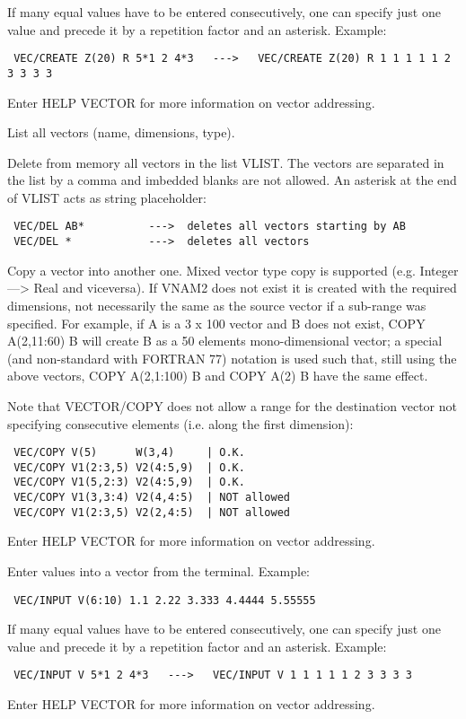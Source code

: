 If many equal values have to be entered consecutively, one can specify just
one value and precede it by a repetition factor and an asterisk. Example:
\begin{verbatim}
 VEC/CREATE Z(20) R 5*1 2 4*3   --->   VEC/CREATE Z(20) R 1 1 1 1 1 2 3 3 3 3
\end{verbatim}
Enter HELP VECTOR for more information on vector addressing.
\ENDTEXT

\BEGTEXT
List all vectors (name, dimensions, type).
\ENDTEXT

\BEGARG
{}
\ENDARG
\BEGTEXT
Delete from memory all vectors in the list VLIST.
The vectors are separated in the list by a comma and imbedded blanks
are not allowed. An asterisk at the end of VLIST acts as string placeholder:
\begin{verbatim}
 VEC/DEL AB*          --->  deletes all vectors starting by AB
 VEC/DEL *            --->  deletes all vectors
\end{verbatim}
\ENDTEXT

\BEGARG
{}
\ENDARG
\BEGTEXT
Copy a vector into another one.
Mixed vector type copy is supported (e.g. Integer ---> Real and viceversa).
If VNAM2 does not exist it is created with the required dimensions,
not necessarily the same as the source vector if a sub-range was specified.
For example, if A is a 3 x 100 vector and B does not exist,
COPY A(2,11:60) B will create B as a 50 elements mono-dimensional vector;
a special (and non-standard with FORTRAN 77) notation is used such that,
still using the above vectors, COPY A(2,1:100) B and COPY A(2) B have the
same effect.

Note that VECTOR/COPY does not allow a range for the destination vector
not specifying consecutive elements (i.e. along the first dimension):
\begin{verbatim}
 VEC/COPY V(5)      W(3,4)     | O.K.
 VEC/COPY V1(2:3,5) V2(4:5,9)  | O.K.
 VEC/COPY V1(5,2:3) V2(4:5,9)  | O.K.
 VEC/COPY V1(3,3:4) V2(4,4:5)  | NOT allowed
 VEC/COPY V1(2:3,5) V2(2,4:5)  | NOT allowed
\end{verbatim}
Enter HELP VECTOR for more information on vector addressing.
\ENDTEXT

\BEGARG
{}
\ENDARG
\BEGTEXT
Enter values into a vector from the terminal.
Example:
\begin{verbatim}
 VEC/INPUT V(6:10) 1.1 2.22 3.333 4.4444 5.55555
\end{verbatim}
If many equal values have to be entered consecutively, one can specify just
one value and precede it by a repetition factor and an asterisk. Example:
\begin{verbatim}
 VEC/INPUT V 5*1 2 4*3   --->   VEC/INPUT V 1 1 1 1 1 2 3 3 3 3
\end{verbatim}
Enter HELP VECTOR for more information on vector addressing.
\ENDTEXT

